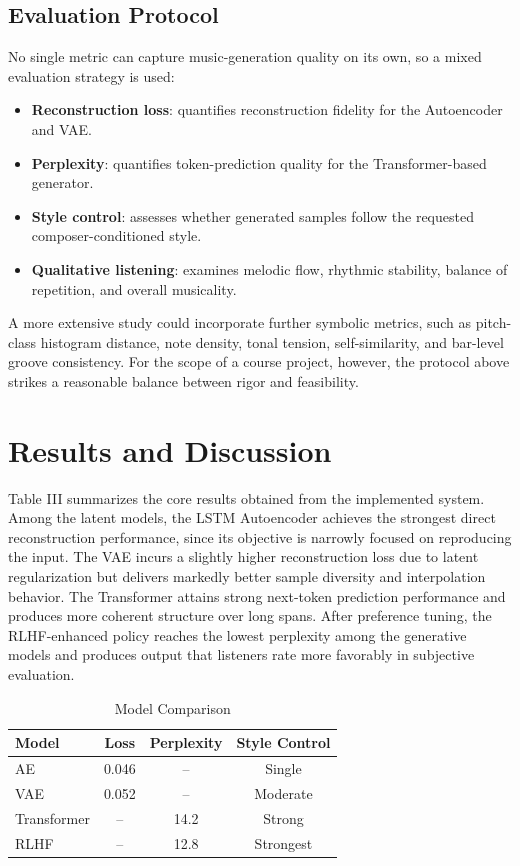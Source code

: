 \documentclass[conference]{IEEEtran}
\begin{document}
\subsection{Evaluation Protocol}
No single metric can capture music-generation quality on its own, so a mixed evaluation strategy is used:
\begin{itemize}
\item \textbf{Reconstruction loss}: quantifies reconstruction fidelity for the Autoencoder and VAE.
\item \textbf{Perplexity}: quantifies token-prediction quality for the Transformer-based generator.
\item \textbf{Style control}: assesses whether generated samples follow the requested composer-conditioned style.
\item \textbf{Qualitative listening}: examines melodic flow, rhythmic stability, balance of repetition, and overall musicality.
\end{itemize}

A more extensive study could incorporate further symbolic metrics, such as pitch-class histogram distance, note density, tonal tension, self-similarity, and bar-level groove consistency. For the scope of a course project, however, the protocol above strikes a reasonable balance between rigor and feasibility.

\section{Results and Discussion}
Table III summarizes the core results obtained from the implemented system. Among the latent models, the LSTM Autoencoder achieves the strongest direct reconstruction performance, since its objective is narrowly focused on reproducing the input. The VAE incurs a slightly higher reconstruction loss due to latent regularization but delivers markedly better sample diversity and interpolation behavior. The Transformer attains strong next-token prediction performance and produces more coherent structure over long spans. After preference tuning, the RLHF-enhanced policy reaches the lowest perplexity among the generative models and produces output that listeners rate more favorably in subjective evaluation.

\begin{table}[ht]
\centering
\caption{Model Comparison}
\begin{tabular}{|l|c|c|c|}
\hline
\textbf{Model} & \textbf{Loss} & \textbf{Perplexity} & \textbf{Style Control} \\ \hline
AE & 0.046 & -- & Single \\ \hline
VAE & 0.052 & -- & Moderate \\ \hline
Transformer & -- & 14.2 & Strong \\ \hline
RLHF & -- & 12.8 & Strongest \\ \hline
\end{tabular}
\end{table}
\end{document}
